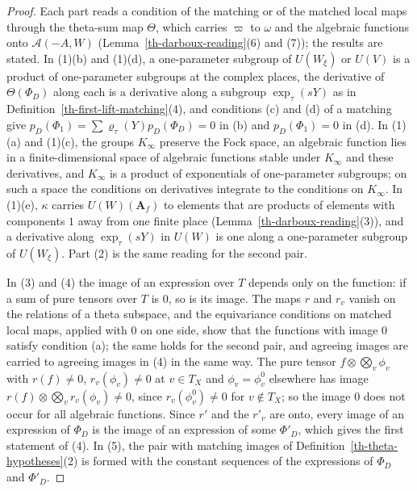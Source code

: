\begin{proof}
Each part reads a condition of the matching or of the matched local maps
through the theta-sum map $\Theta$, which carries $\varpi$ to $\omega$ and the
algebraic functions onto $\mathcal A(-A,W)$
(Lemma~\ref{th-darboux-reading}(6) and (7)); the results are stated. In
(1)(b) and (1)(d), a one-parameter subgroup of $U(W_\xi)$ or $U(V)$ is a
product of one-parameter subgroups at the complex places, the derivative of
$\Theta(\Phi_D)$ along each is a derivative along a subgroup
$\exp_\tau(sY)$ as in Definition~\ref{th-first-lift-matching}(4), and
conditions (c) and (d) of a matching give $p_D(\Phi_1)=\sum\varrho_\tau(Y)
p_D(\Phi_D)=0$ in (b) and $p_D(\Phi_1)=0$ in (d). In (1)(a) and (1)(c), the
groups $K_\infty$ preserve the Fock space, an algebraic function lies in a
finite-dimensional space of algebraic functions stable under $K_\infty$ and
these derivatives, and $K_\infty$ is a product of exponentials of
one-parameter subgroups; on such a space the conditions on derivatives
integrate to the conditions on $K_\infty$. In (1)(e), $\kappa$ carries
$U(W)(\mathbf A_f)$ to elements that are products of elements with components
$1$ away from one finite place (Lemma~\ref{th-darboux-reading}(3)), and a
derivative along $\exp_\tau(sY)$ in $U(W)$ is one along a one-parameter
subgroup of $U(W_\xi)$. Part (2) is the same reading for the second pair.

In (3) and (4) the image of an expression over $T$ depends only on the
function: if a sum of pure tensors over $T$ is $0$, so is its image. The maps
$r$ and $r_v$ vanish on the relations of a theta subspace, and the
equivariance conditions on matched local maps, applied with $0$ on one side,
show that the functions with image $0$ satisfy condition (a); the same holds
for the second pair, and agreeing images are carried to agreeing images in
(4) in the same way. The pure tensor $f\otimes\bigotimes_v\phi_v$ with
$r(f)\neq0$, $r_v(\phi_v)\neq0$ at $v\in T_X$ and $\phi_v=\phi^0_v$ elsewhere
has image $r(f)\otimes\bigotimes_vr_v(\phi_v)\neq0$, since
$r_v(\phi^0_v)\neq0$ for $v\notin T_X$; so the image $0$ does not occur for
all algebraic functions. Since $r'$ and the $r'_v$ are onto, every image of an
expression of $\Phi_D$ is the image of an expression of some $\Phi'_D$, which
gives the first statement of (4). In (5), the pair with matching images of
Definition~\ref{th-theta-hypotheses}(2) is formed with the constant sequences
of the expressions of $\Phi_D$ and $\Phi'_D$.
\end{proof}

